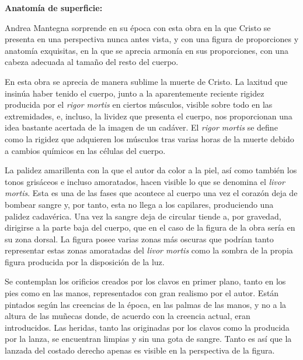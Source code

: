 

\vspace{12pt}
\textbf{Anatomía de superficie:}

Andrea Mantegna sorprende en su época con esta obra en la que Cristo se presenta en una perspectiva nunca antes vista, y con una figura de proporciones y anatomía exquisitas,%
 en la que se aprecia armonía en sus proporciones, con una cabeza adecuada al tamaño del resto del cuerpo.

En esta obra se aprecia de manera sublime la muerte de Cristo. La laxitud que insinúa haber tenido el cuerpo, junto a la aparentemente reciente rigidez producida por el \textit{rigor mortis} en ciertos músculos, visible sobre todo en las extremidades, e, incluso, la lividez que presenta el cuerpo, nos proporcionan una idea bastante acertada de la imagen de un cadáver. El \textit{rigor mortis} se define como la rigidez que adquieren los músculos tras varias horas de la muerte debido a cambios químicos en las células del cuerpo.\cite{RefWorks:60}\cite{RefWorks:56}\cite{RefWorks:55}

La palidez amarillenta con la que el autor da color a la piel, así como también los tonos grisáceos e incluso amoratados, hacen visible lo que se denomina el \textit{livor mortis}. Esta es una de las fases que acontece al cuerpo una vez el corazón deja de bombear sangre y, por tanto, esta no llega a los capilares, produciendo una palidez cadavérica. Una vez la sangre deja de circular tiende a, por gravedad, dirigirse a la parte baja del cuerpo, que en el caso de la figura de la obra sería en su zona dorsal.\cite{RefWorks:60}\cite{RefWorks:56} La figura posee varias zonas más oscuras que podrían tanto representar estas zonas amoratadas del \textit{livor mortis} como la sombra de la propia figura producida por la disposición de la luz.

Se contemplan los orificios creados por los clavos en primer plano, tanto en los pies como en las manos, representados con gran realismo por el autor. Están pintados según las creencias de la época, en las palmas de las manos, y no a la altura de las muñecas donde, de acuerdo con la creencia actual, eran introducidos.
Las heridas, tanto las originadas por los clavos como la producida por la lanza, se encuentran limpias y sin una gota de sangre. Tanto es así que la lanzada del costado derecho apenas es visible en la perspectiva de la figura. 

